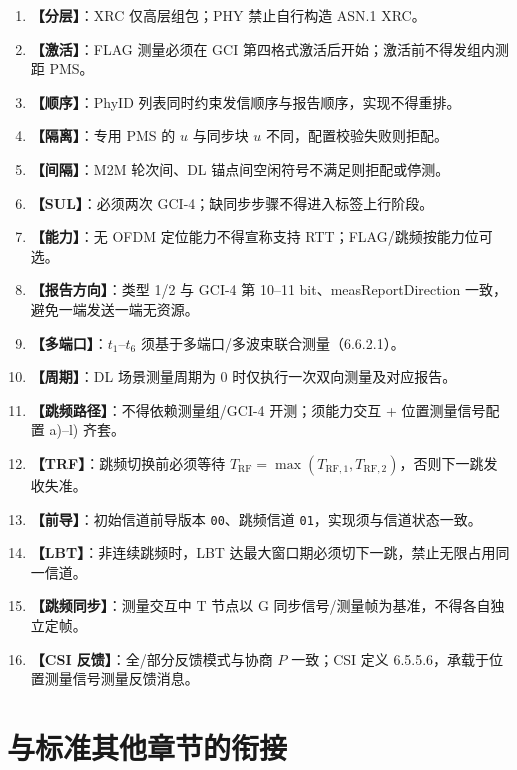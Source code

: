 \documentclass[11pt,a4paper]{ctexart}
\begin{document}
\begin{enumerate}[nosep]
  \item \textbf{【分层】}：XRC 仅高层组包；PHY 禁止自行构造 ASN.1 XRC。
  \item \textbf{【激活】}：FLAG 测量必须在 GCI 第四格式激活后开始；激活前不得发组内测距 PMS。
  \item \textbf{【顺序】}：PhyID 列表同时约束发信顺序与报告顺序，实现不得重排。
  \item \textbf{【隔离】}：专用 PMS 的 $u$ 与同步块 $u$ 不同，配置校验失败则拒配。
  \item \textbf{【间隔】}：M2M 轮次间、DL 锚点间空闲符号不满足则拒配或停测。
  \item \textbf{【SUL】}：必须两次 GCI-4；缺同步步骤不得进入标签上行阶段。
  \item \textbf{【能力】}：无 OFDM 定位能力不得宣称支持 RTT；FLAG/跳频按能力位可选。
  \item \textbf{【报告方向】}：类型 1/2 与 GCI-4 第 10--11 bit、measReportDirection 一致，避免一端发送一端无资源。
  \item \textbf{【多端口】}：$t_1$--$t_6$ 须基于多端口/多波束联合测量（6.6.2.1）。
  \item \textbf{【周期】}：DL 场景测量周期为 0 时仅执行一次双向测量及对应报告。
  \item \textbf{【跳频路径】}：不得依赖测量组/GCI-4 开测；须能力交互 + 位置测量信号配置 a)--l) 齐套。
  \item \textbf{【TRF】}：跳频切换前必须等待 $T_{\mathrm{RF}}=\max(T_{\mathrm{RF},1},T_{\mathrm{RF},2})$，否则下一跳发收失准。
  \item \textbf{【前导】}：初始信道前导版本 \texttt{00}、跳频信道 \texttt{01}，实现须与信道状态一致。
  \item \textbf{【LBT】}：非连续跳频时，LBT 达最大窗口期必须切下一跳，禁止无限占用同一信道。
  \item \textbf{【跳频同步】}：测量交互中 T 节点以 G 同步信号/测量帧为基准，不得各自独立定帧。
  \item \textbf{【CSI 反馈】}：全/部分反馈模式与协商 $P$ 一致；CSI 定义 6.5.5.6，承载于位置测量信号测量反馈消息。
\end{enumerate}

\section{与标准其他章节的衔接}
\end{document}

